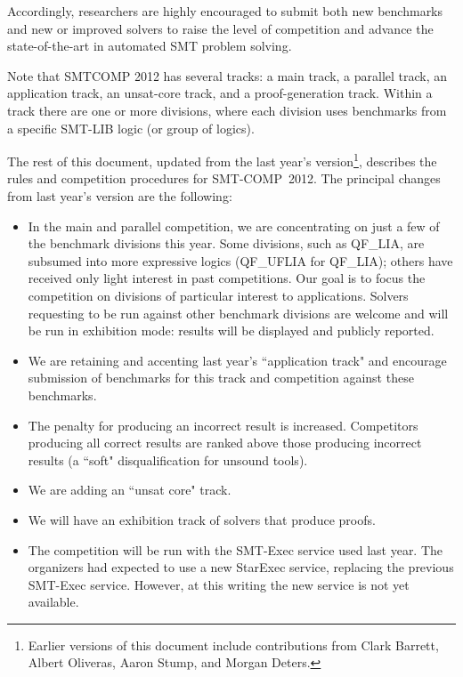 \documentclass[12pt]{article}
\begin{document}
Accordingly, researchers are highly encouraged to submit both new benchmarks
and new or improved solvers to raise the level of competition and advance
the state-of-the-art in automated SMT problem solving.

Note that SMTCOMP 2012 has several tracks: a main track, a parallel track, an
application track, an unsat-core track, and a proof-generation track.
Within a track there are one or more divisions, where each division
uses benchmarks from a specific SMT-LIB logic (or group of logics).

The rest of this document, updated from the last year's
version\footnote{Earlier versions of this document include contributions from
Clark Barrett, Albert Oliveras, Aaron Stump, and Morgan Deters.},
describes the rules and competition procedures for SMT-COMP~2012.
The principal changes from last year's version are the following:
\begin{itemize}

\item In the main and parallel competition, we are concentrating on just a few of the benchmark divisions this year.
  Some divisions, such as QF\_LIA, are subsumed into more expressive
  logics (QF\_UFLIA for QF\_LIA); others have received only light interest in past competitions. Our goal is to
  focus the competition on divisions of particular interest to
  applications. Solvers requesting to be run against other benchmark divisions are
  welcome and will be run in exhibition mode:
  results will be displayed and publicly reported.

\item We are retaining and accenting last year's ``application track" and
  encourage submission of benchmarks for this track and competition against these
  benchmarks.

\item The penalty for producing an incorrect result is increased. Competitors
  producing all correct results are ranked above those producing
  incorrect results (a ``soft" disqualification for unsound tools).

\item We are adding an ``unsat core" track.

\item We will have an exhibition track of solvers that produce proofs.

\item The competition will be run with the SMT-Exec service used last year.
  The organizers had expected to use a new StarExec service, replacing
  the previous SMT-Exec service. However, at this writing the new service
  is not yet available.

\end{itemize}
\end{document}

